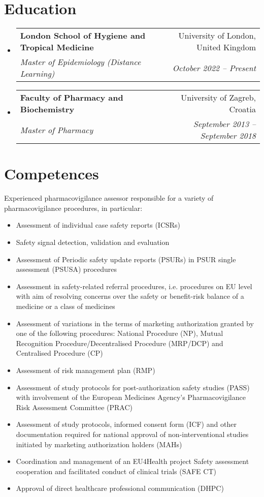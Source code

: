 \documentclass[letterpaper,11pt]{article}
\makeatletter
\newcommand{\resumeSubheading}[4]{
  \vspace{-2pt}\item
    \begin{tabular*}{0.97\textwidth}[t]{l@{\extracolsep{\fill}}r}
      \textbf{#1} & #2 \\
      \textit{\small#3} & \textit{\small #4} \\
    \end{tabular*}\vspace{-7pt}
}
\newcommand{\resumeSubHeadingListStart}{\begin{itemize}[leftmargin=0.15in, label={}]}
\newcommand{\resumeSubHeadingListEnd}{\end{itemize}}
\makeatother
\begin{document}
\section{{Education}}
  \resumeSubHeadingListStart
      \resumeSubheading
      {{London School of Hygiene and Tropical Medicine}}{University of London, United Kingdom}
      {Master of Epidemiology (Distance Learning)}{October 2022 -- Present}
    \resumeSubheading
      {{Faculty of Pharmacy and Biochemistry}}{University of Zagreb, Croatia}
      {Master of Pharmacy}{September 2013 -- September 2018}
  \resumeSubHeadingListEnd
%
\section{{Competences}} 
Experienced pharmacovigilance assessor responsible for a variety of pharmacovigilance procedures, in particular:
\begin{itemize}
\item Assessment of individual case safety reports (ICSRs)
\item Safety signal detection, validation and evaluation
\item Assessment of Periodic safety update reports (PSURs) in PSUR single assessment (PSUSA) procedures
\item Assessment in safety-related referral procedures, i.e. procedures on EU level with aim of resolving concerns over the safety or benefit-risk balance of a medicine or a class of medicines
\item Assessment of variations in the terms of marketing authorization granted by one of the following procedures: National Procedure (NP), Mutual Recognition Procedure/Decentralised Procedure (MRP/DCP) and Centralised Procedure (CP)
\item Assessment of risk management plan (RMP)
\item Assessment of study protocols for post-authorization safety studies (PASS) with involvement of the European Medicines Agency's Pharmacovigilance Risk Assessment Committee (PRAC)
\item Assessment of study protocols, informed consent form (ICF) and other documentation required for national approval of non-interventional studies initiated by marketing authorization holders (MAHs)
\item Coordination and management of an EU4Health project Safety assessment cooperation and facilitated conduct of clinical trials (SAFE CT)
\item Approval of direct healthcare professional communication (DHPC)
\end{itemize}
\end{document}
